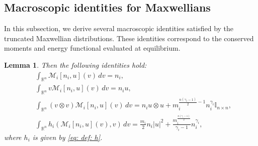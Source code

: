\documentclass[10pt,reqno]{amsart}
\numberwithin{equation}{section}
\newtheorem{lemma}{Lemma}[section]
\newcommand{\R}{\mathbb R}
\newcommand{\calM}{\mathcal M}
\begin{document}
\subsection{Macroscopic identities for Maxwellians}
In this subsection, we derive several macroscopic identities satisfied by the truncated Maxwellian distributions. These identities correspond to the conserved moments and energy functional evaluated at equilibrium. 
\begin{lemma}\label{lem_ident}
Then the following identities hold:
    \begin{align}
        &\int_{\R^n} \calM_i[n_i, u](v)\,dv = n_i, \nonumber \\
        &\int_{\R^n} v\calM_i[n_i, u](v)\,dv = n_i u, \label{eq: vM}\\
                &\int_{\R^n} (v\otimes v) \calM_i[n_i, u](v)\,dv = n_i u \otimes u + m_i^{\frac{n(\gamma_i-1)}{2}-1} n_i^{\gamma_i} \label{eq: tens prod M1}\mathbb{I}_{n \times n},\\
        &\int_{\R^n} h_i(\calM_i[n_i, u](v),v)\,dv = \frac{m_i}{2}n_i|u|^2 + \frac{m_i^{\frac{n(\gamma_i-1)}{2}}}{\gamma_i - 1} n_i^{\gamma_i}\nonumber ,
    \end{align}
    where $h_i$ is given by \eqref{eq: def: h}. 
\end{lemma}
\end{document}
